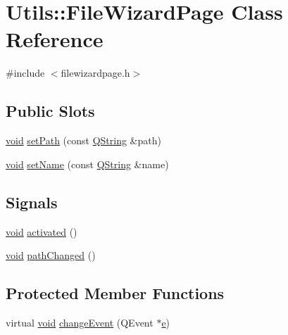 \hypertarget{class_utils_1_1_file_wizard_page}{\section{\-Utils\-:\-:\-File\-Wizard\-Page \-Class \-Reference}
\label{class_utils_1_1_file_wizard_page}
}


{\ttfamily \#include $<$filewizardpage.\-h$>$}

\subsection*{\-Public \-Slots}
\begin{DoxyCompactItemize}
\item 
\hyperlink{group___u_a_v_objects_plugin_ga444cf2ff3f0ecbe028adce838d373f5c}{void} \hyperlink{class_utils_1_1_file_wizard_page_aa369336019ec0a3440eeded6a7364290}{set\-Path} (const \hyperlink{group___u_a_v_objects_plugin_gab9d252f49c333c94a72f97ce3105a32d}{\-Q\-String} \&path)
\item 
\hyperlink{group___u_a_v_objects_plugin_ga444cf2ff3f0ecbe028adce838d373f5c}{void} \hyperlink{class_utils_1_1_file_wizard_page_a7d3a8653221422ee299c0ce026c67707}{set\-Name} (const \hyperlink{group___u_a_v_objects_plugin_gab9d252f49c333c94a72f97ce3105a32d}{\-Q\-String} \&name)
\end{DoxyCompactItemize}
\subsection*{\-Signals}
\begin{DoxyCompactItemize}
\item 
\hyperlink{group___u_a_v_objects_plugin_ga444cf2ff3f0ecbe028adce838d373f5c}{void} \hyperlink{class_utils_1_1_file_wizard_page_aad2634d8d10b55dd107b9ad657dd9914}{activated} ()
\item 
\hyperlink{group___u_a_v_objects_plugin_ga444cf2ff3f0ecbe028adce838d373f5c}{void} \hyperlink{class_utils_1_1_file_wizard_page_a009e6ae82f20b3165360ede93cce10f1}{path\-Changed} ()
\end{DoxyCompactItemize}
\subsection*{\-Protected \-Member \-Functions}
\begin{DoxyCompactItemize}
\item 
virtual \hyperlink{group___u_a_v_objects_plugin_ga444cf2ff3f0ecbe028adce838d373f5c}{void} \hyperlink{class_utils_1_1_file_wizard_page_a4116e181fba3857cce5aa306eff1dac4}{change\-Event} (\-Q\-Event $\ast$\hyperlink{_o_p_plots_8m_a9425be9aab51621e317ba7ade564b570}{e})
\end{DoxyCompactItemize}


